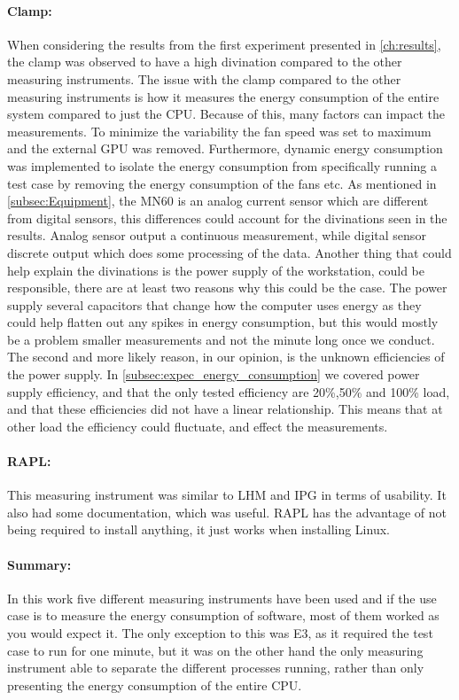 \paragraph*{Clamp:} When considering the results from the first experiment presented in \cref{ch:results}, the clamp was observed to have a high divination compared to the other measuring instruments. The issue with the clamp compared to the other measuring instruments is how it measures the energy consumption of the entire system compared to just the CPU. Because of this, many factors can impact the measurements. To minimize the variability the fan speed was set to maximum and the external GPU was removed. Furthermore, dynamic energy consumption was implemented to isolate the energy consumption from specifically running a test case by removing the energy consumption of the fans etc. As mentioned in \cref{subsec:Equipment}, the MN60 is an analog current sensor which are different from digital sensors, this differences could account for the divinations seen in the results. Analog sensor output a continuous measurement, while digital sensor discrete output which does some processing of the data.\cite{DigimonsVSAnamons} Another thing that could help explain the divinations is the power supply of the workstation, could be responsible, there are at least two reasons why this could be the case. The power supply several capacitors that change how the computer uses energy as they could help flatten out any spikes in energy consumption, but this would mostly be a problem smaller measurements and not the minute long once we conduct\cite{hackenberg2013}. The second and more likely reason, in our opinion, is the unknown efficiencies of the power supply. In \cref{subsec:expec_energy_consumption} we covered power supply efficiency, and that the only tested efficiency are 20\%,50\% and 100\% load, and that these efficiencies did not have a linear relationship. This means that at other load the efficiency could fluctuate, and effect the measurements. 


\paragraph*{RAPL:} This measuring instrument was similar to LHM and IPG in terms of usability. It also had some documentation, which was useful. RAPL has the advantage of not being required to install anything, it just works when installing Linux.

\paragraph*{Summary:} In this work five different measuring instruments have been used and if the use case is to measure the energy consumption of software, most of them worked as you would expect it. The only exception to this was E3, as it required the test case to run for one minute, but it was on the other hand the only measuring instrument able to separate the different processes running, rather than only presenting the energy consumption of the entire CPU. 